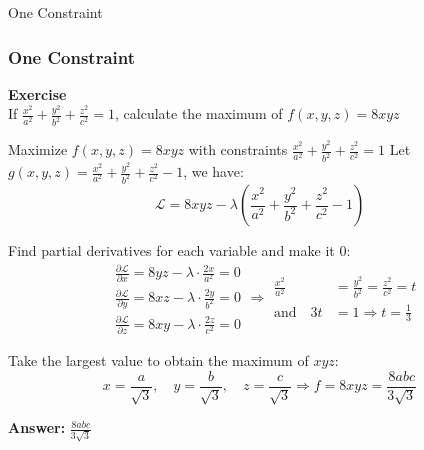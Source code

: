 \documentclass[aspectratio=169, UTF8]{beamer}
\begin{document}
\begin{frame}{One Constraint}
    \frametitle{One Constraint}
    \textbf{Exercise} \\
    If \(\frac{x^2}{a^2} + \frac{y^2}{b^2} + \frac{z^2}{c^2} = 1\), calculate the maximum of \(f(x, y, z) = 8xyz\)
\end{frame}

\begin{frame}{Maximize $f(x,y,z) = 8xyz$ with constraints $\frac{x^2}{a^2} + \frac{y^2}{b^2} + \frac{z^2}{c^2} = 1$}
    \small
    Let $g(x,y,z) = \frac{x^2}{a^2} + \frac{y^2}{b^2} + \frac{z^2}{c^2} - 1$, we have:
    \[
        \mathcal{L} = 8xyz - \lambda \left( \frac{x^2}{a^2} + \frac{y^2}{b^2} + \frac{z^2}{c^2} - 1 \right)
    \]

    Find partial derivatives for each variable and make it 0:
    \[
        \begin{aligned}
             & \frac{\partial \mathcal{L}}{\partial x} = 8yz - \lambda \cdot \frac{2x}{a^2} = 0 \\
             & \frac{\partial \mathcal{L}}{\partial y} = 8xz - \lambda \cdot \frac{2y}{b^2} = 0 \\
             & \frac{\partial \mathcal{L}}{\partial z} = 8xy - \lambda \cdot \frac{2z}{c^2} = 0
        \end{aligned}
        \Rightarrow
        \begin{aligned}
            \frac{x^2}{a^2}     & = \frac{y^2}{b^2} = \frac{z^2}{c^2} = t \\
            \text{and} \quad 3t & = 1 \Rightarrow t = \frac{1}{3}
        \end{aligned}
    \]

    Take the largest value to obtain the maximum of $xyz$:
    \[
        x = \frac{a}{\sqrt{3}},\quad y = \frac{b}{\sqrt{3}},\quad z = \frac{c}{\sqrt{3}}
        \Rightarrow
        f = 8xyz = \frac{8abc}{3\sqrt{3}}
    \]

    \textbf{Answer:} \quad $\boxed{\frac{8abc}{3\sqrt{3}}}$
\end{frame}
\end{document}

